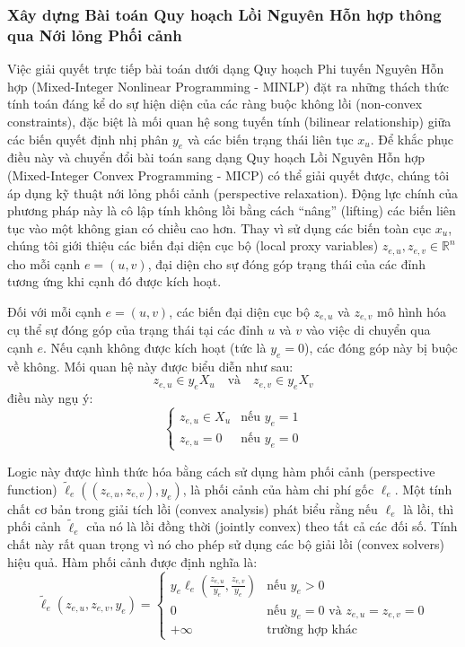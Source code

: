 \subsubsection{Xây dựng Bài toán Quy hoạch Lồi Nguyên Hỗn hợp thông qua Nới lỏng Phối cảnh}

Việc giải quyết trực tiếp bài toán dưới dạng Quy hoạch Phi tuyến Nguyên Hỗn hợp (Mixed-Integer Nonlinear Programming - MINLP) đặt ra những thách thức tính toán đáng kể do sự hiện diện của các ràng buộc không lồi (non-convex constraints), đặc biệt là mối quan hệ song tuyến tính (bilinear relationship) giữa các biến quyết định nhị phân $y_e$ và các biến trạng thái liên tục $x_u$. Để khắc phục điều này và chuyển đổi bài toán sang dạng Quy hoạch Lồi Nguyên Hỗn hợp (Mixed-Integer Convex Programming - MICP) có thể giải quyết được, chúng tôi áp dụng kỹ thuật nới lỏng phối cảnh (perspective relaxation). Động lực chính của phương pháp này là cô lập tính không lồi bằng cách ``nâng'' (lifting) các biến liên tục vào một không gian có chiều cao hơn. Thay vì sử dụng các biến toàn cục $x_u$, chúng tôi giới thiệu các biến đại diện cục bộ (local proxy variables) $z_{e,u}, z_{e,v} \in \mathbb{R}^n$ cho mỗi cạnh $e=(u,v)$, đại diện cho sự đóng góp trạng thái của các đỉnh tương ứng khi cạnh đó được kích hoạt.

Đối với mỗi cạnh $e=(u, v)$, các biến đại diện cục bộ $z_{e,u}$ và $z_{e,v}$ mô hình hóa cụ thể sự đóng góp của trạng thái tại các đỉnh $u$ và $v$ vào việc di chuyển qua cạnh $e$. Nếu cạnh không được kích hoạt (tức là $y_e=0$), các đóng góp này bị buộc về không. Mối quan hệ này được biểu diễn như sau:
\[
z_{e,u} \in y_e X_u \quad \text{và} \quad z_{e,v} \in y_e X_v
\]
điều này ngụ ý:
\[\begin{cases}
z_{e,u} \in X_u & \text{nếu } y_e = 1 \\
z_{e,u} = 0 & \text{nếu } y_e = 0
\end{cases}
\]

Logic này được hình thức hóa bằng cách sử dụng hàm phối cảnh (perspective function) $\tilde{\ell}_e((z_{e,u}, z_{e,v}), y_e)$, là phối cảnh của hàm chi phí gốc $\ell_e$. Một tính chất cơ bản trong giải tích lồi (convex analysis) phát biểu rằng nếu $\ell_e$ là lồi, thì phối cảnh $\tilde{\ell}_e$ của nó là lồi đồng thời (jointly convex) theo tất cả các đối số. Tính chất này rất quan trọng vì nó cho phép sử dụng các bộ giải lồi (convex solvers) hiệu quả. Hàm phối cảnh được định nghĩa là:
\[
\tilde{\ell}_e(z_{e,u}, z_{e,v}, y_e) = 
\begin{cases} 
y_e \ell_e\left(\frac{z_{e,u}}{y_e}, \frac{z_{e,v}}{y_e}\right) & \text{nếu } y_e > 0 \\
0 & \text{nếu } y_e = 0 \text{ và } z_{e,u} = z_{e,v} = 0 \\
+\infty & \text{trường hợp khác}
\end{cases}
\]

